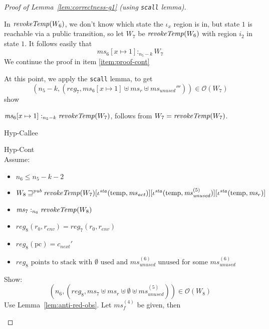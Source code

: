 \documentclass[a4paper]{article}
\newcommand{\update}[2]{[#1 \mapsto #2]}
\newcommand{\var}[1]{\mathit{#1}}
\newcommand{\hs}{\var{ms}}
\newcommand{\ms}{\hs}
\newcommand{\pcreg}{\mathrm{pc}}
\newcommand{\reg}{\var{reg}}
\newcommand{\heap}{\var{mem}}
\newcommand{\sta}{\var{sta}}
\newcommand{\env}{\var{env}}
\newcommand{\unused}{\var{unused}}
\newcommand{\act}{\var{act}}
\newcommand{\plainfun}[2]{
  \ifthenelse{\equal{#2}{}}
  {\mathit{#1}}
  {\mathit{#1}(#2)}
}
\newcommand{\revokeTemp}[1]{\plainfun{revokeTemp}{#1}}
\newcommand{\futurewk}{\mathbin{\sqsupseteq}^{\var{pub}}}
\newcommand{\heapSat}[3][\heap]{#1 :_{#2} #3}
\newcommand{\memSat}[3][n]{\heapSat[#2]{#1}{#3}}
\newcommand{\observations}{\mathcal{O}}
\newcommand{\npair}[2][n]{\left(#1,#2 \right)}
\newcommand{\plainview}[1]{\mathrm{#1}}
\newcommand{\temp}{\plainview{temp}}
\begin{document}
\begin{proof}[Proof of Lemma~\ref{lem:correctness-g1} (using \texttt{scall} lemma)]
\begin{enumproof}[resume]
\begin{enumproof}
\begin{enumproof}
\begin{enumproof}
\begin{enumproof}
\begin{itemize}
                      \end{itemize}
                      In $\revokeTemp{W_6}$, we don't know which state the $\iota_x$ region is in, but state $1$ is reachable via a public transition, so let $W_7$ be $\revokeTemp{W_6}$ with region $i_2$ in state $1$. It follows easily that
                      \[
                        \memSat[n_5-k]{\ms_6\update{x}{1}}{W_7}
                      \]
                      We continue the proof in item \ref{item:proof-cont}
                  \end{enumproof}
              \end{enumproof}
          \end{enumproof}
      \end{enumproof}
      \item \label{item:proof-cont} At this point, we apply the \texttt{scall} lemma, to get
        \[
          \npair[n_5-k]{(\reg_7,\ms_6\update{x}{1} \uplus \ms_r \uplus \ms_\unused''')} \in \observations(W_7)
        \]
        show
        \begin{enumproof}
          \item $\memSat[n_5-k]{\ms_6\update{x}{1}}{\revokeTemp{W_7}}$, follows from $W_7= \revokeTemp{W_7}$.
          \item Hyp-Callee
          \item Hyp-Cont\\
            Assume:
            \begin{itemize}
            \item $n_6 \leq n_5-k-2$
            \item $W_8 \futurewk \revokeTemp{W_7}[\iota^{\sta}(\temp,\ms_\act)][\iota^\sta(\temp,\ms_{\mathit{unused}}^{(5)})][\iota^\sta(\temp,\ms_r)]$
            \item $\memSat[n_6]{\ms_7}{\revokeTemp{W_8}}$ 
            \item $\reg_8(r_0,r_\env) = \reg_7(r_0,r_\env)$
            \item $\reg_8(\pcreg) = c_{\var{next}}'$
            \item $\reg_8 \text{ points to stack with $\emptyset$ used and $\ms_{\mathit{unused}}^{(6)}$ unused}$ for some $\ms_{\mathit{unused}}^{(6)}$
            \end{itemize}
            Show:
            \[
              \npair[n_6]{(\reg_8,\ms_7 \uplus \ms_r \uplus \emptyset \uplus \ms_\unused^{(5)})} \in \observations(W_8)
            \]
            Use Lemma~\ref{lem:anti-red-obs}. Let $\ms_f^{(4)}$ be given, then

\end{enumproof}
\end{enumproof}
\end{proof}
\end{document}

